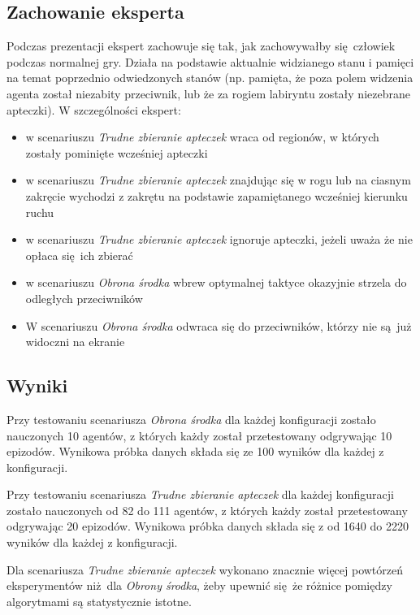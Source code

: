 \documentclass[polish,master,a4paper,oneside]{ppfcmthesis}
\begin{document}
\subsection {Zachowanie eksperta}
Podczas prezentacji ekspert zachowuje się tak, jak zachowywałby się człowiek podczas normalnej gry. Działa na podstawie aktualnie widzianego stanu i pamięci na temat poprzednio odwiedzonych stanów (np. pamięta, że poza polem widzenia agenta został niezabity przeciwnik, lub że za rogiem labiryntu zostały niezebrane apteczki). W szczególności ekspert:
\begin{itemize}
\item{w scenariuszu \textit{Trudne zbieranie apteczek} wraca od regionów, w których zostały pominięte wcześniej apteczki}
\item{w scenariuszu \textit{Trudne zbieranie apteczek} znajdując się w rogu lub na ciasnym zakręcie wychodzi z zakrętu na podstawie zapamiętanego wcześniej kierunku ruchu}
\item{w scenariuszu \textit{Trudne zbieranie apteczek} ignoruje apteczki, jeżeli uważa że nie opłaca się ich zbierać}
\item{w scenariuszu \textit{Obrona środka} wbrew optymalnej taktyce okazyjnie strzela do odległych przeciwników}
\item{W scenariuszu \textit{Obrona środka} odwraca się do przeciwników, którzy nie są już widoczni na ekranie}
\end{itemize}


\subsection{Wyniki}

Przy testowaniu scenariusza \textit{Obrona środka} dla każdej konfiguracji zostało nauczonych 10 agentów, z których każdy został przetestowany odgrywając 10 epizodów. Wynikowa próbka danych składa się ze 100 wyników dla każdej z konfiguracji.

Przy testowaniu scenariusza \textit{Trudne zbieranie apteczek} dla każdej konfiguracji zostało nauczonych od 82 do 111 agentów, z których każdy został przetestowany odgrywając 20 epizodów. Wynikowa próbka danych składa się z od 1640 do 2220 wyników dla każdej z konfiguracji.

Dla scenariusza \textit{Trudne zbieranie apteczek} wykonano znacznie więcej powtórzeń eksperymentów niż dla \textit{Obrony środka}, żeby upewnić się że różnice pomiędzy algorytmami są statystycznie istotne.
\end{document}
